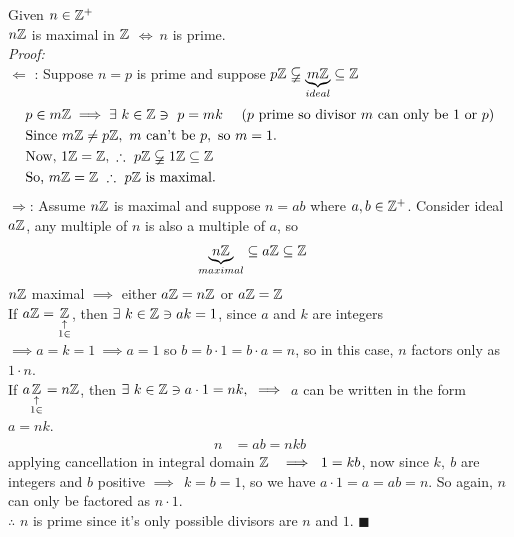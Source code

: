 \begin{proposition}
    Given $n\in {\mathbb{ Z}}^{+}$ \\ $n{\mathbb{ Z}}$ is maximal in ${\mathbb{ Z}}$ $\iff \ n$ is prime. \\
    \textit{Proof: } \\ \steezybreak
    $\Leftarrow$ : Suppose $n=p$ is prime and suppose $p{\mathbb{ Z}} \varsubsetneqq \underbrace{m{\mathbb{ Z}}}_{ideal} \subseteq {\mathbb{ Z}}$
    \begin{align}
        &p\in m\Z \implies \exists \ k \in \Z \ni \ p=mk \ \ \ \ (p\text{ prime so divisor } m \text{ can only be }1 \text{ or }p) \nonumber \\
        &\text{Since }m\Z \neq p\Z, \ m\text{ can't be }p, \text{ so }m=1. \nonumber \\
        & \text{Now, }1\Z=\Z, \ \therefore \ p\Z \varsubsetneqq 1\Z \subseteq \Z \nonumber \\
        &\text{So, }m\Z=\Z \ \therefore \ p\Z \text{ is maximal.} \nonumber
    \end{align}
    $\Rightarrow$: Assume $n{\mathbb{ Z}}$ is maximal and suppose $n=ab$ where $a,b\in {\mathbb{ Z}}^{+}$. Consider ideal $a{\mathbb{ Z}}$, any multiple of $n$ is also a multiple of $a$, so
    \begin{align}
        \underbrace{n{\mathbb{ Z}}}_{maximal} &\subseteq a{\mathbb{ Z}} \subseteq {\mathbb{ Z}} \nonumber
    \end{align}
    $n{\mathbb{ Z}}$ maximal $\implies$ either $a{\mathbb{ Z}}=n{\mathbb{ Z}}$ or $a{\mathbb{ Z}}={\mathbb{ Z}}$ \\ \steezybreak
    If $a{\mathbb{ Z}}=\underset{\substack{\uparrow \\ 1\in }}{{\mathbb{ Z}}}$, then $\exists \ k\in {\mathbb{ Z}} \ni ak = 1$, since $a$ and $k$ are integers $\implies a=k=1 \ \implies a=1$ so $b=b\cdot 1 = b\cdot a = n$, so in this case, $n$ factors only as $1\cdot n$. \\ \steezybreak
    If $a \underset{\substack{\uparrow \\ 1 \in}}{{\mathbb{ Z}}} = n{\mathbb{ Z}}$, then $\exists \ k\in {\mathbb{ Z}} \ni a\cdot 1 =nk, \ \implies$ $a$ can be written in the form $a=nk$.
    \begin{align}
        n&= ab = nkb \nonumber
    \end{align}
    applying cancellation in integral domain $\Z \ \ \implies \ 1=kb$, now since $k,\ b$ are integers and $b$ positive $\implies \ \ k=b=1$, so we have $a\cdot 1 = a = ab=n$. So again, $n$ can only be factored as $n\cdot 1$. \\ \steezybreak
    $\therefore$ $ n$ is prime since it's only possible divisors are $n$ and $1$. $\blacksquare$
\end{proposition}

